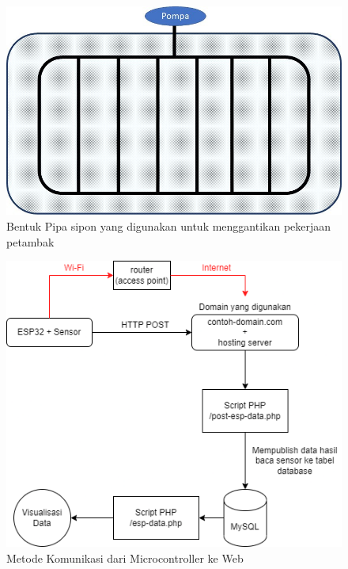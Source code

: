 \begin{figure}[htbp]
  \centering

  \includegraphics[scale=0.4]{gambar/bentukpipa.jpg}

  \caption{Bentuk Pipa sipon yang digunakan untuk menggantikan pekerjaan petambak}%
  \label{fig:bentukpipa}
\end{figure}

\begin{figure}[htbp]
  \centering

  \includegraphics[scale=0.7]{gambar/metodekomunikasi.png}

  \caption{Metode Komunikasi dari Microcontroller ke Web}%
  \label{fig:metodekomunikasi}
\end{figure}

